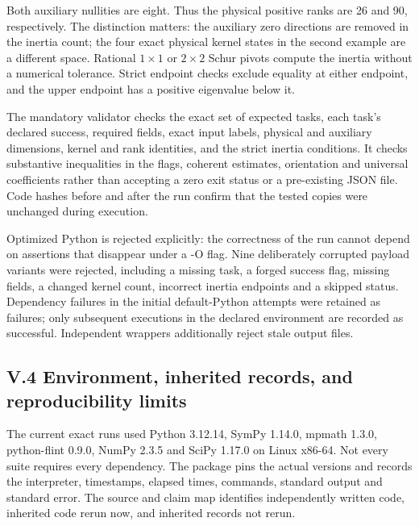 Both auxiliary nullities are eight. Thus the physical positive ranks are 26 and 90, respectively. The distinction matters: the auxiliary zero directions are removed in the inertia count; the four exact physical kernel states in the second example are a different space. Rational \(1\times1\) or \(2\times2\) Schur pivots compute the inertia without a numerical tolerance. Strict endpoint checks exclude equality at either endpoint, and the upper endpoint has a positive eigenvalue below it.

The mandatory validator checks the exact set of expected tasks, each task's declared success, required fields, exact input labels, physical and auxiliary dimensions, kernel and rank identities, and the strict inertia conditions. It checks substantive inequalities in the flags, coherent estimates, orientation and universal coefficients rather than accepting a zero exit status or a pre-existing JSON file. Code hashes before and after the run confirm that the tested copies were unchanged during execution.

Optimized Python is rejected explicitly: the correctness of the run cannot depend on assertions that disappear under a -O flag. Nine deliberately corrupted payload variants were rejected, including a missing task, a forged success flag, missing fields, a changed kernel count, incorrect inertia endpoints and a skipped status. Dependency failures in the initial default-Python attempts were retained as failures; only subsequent executions in the declared environment are recorded as successful. Independent wrappers additionally reject stale output files.

\hypertarget{v.4-environment-inherited-records-and-reproducibility-limits}{%
\subsection{V.4 Environment, inherited records, and reproducibility limits}\label{v.4-environment-inherited-records-and-reproducibility-limits}}

The current exact runs used Python 3.12.14, SymPy 1.14.0, mpmath 1.3.0, python-flint 0.9.0, NumPy 2.3.5 and SciPy 1.17.0 on Linux x86-64. Not every suite requires every dependency. The package pins the actual versions and records the interpreter, timestamps, elapsed times, commands, standard output and standard error. The source and claim map identifies independently written code, inherited code rerun now, and inherited records not rerun.


